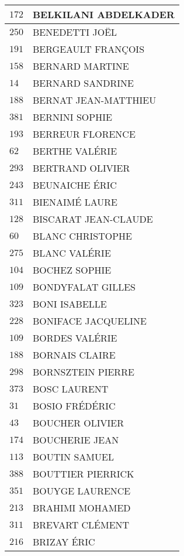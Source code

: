 \begin{xltabular}{\linewidth}{|l|X|}
    \hline
    $172$ & BELKILANI ABDELKADER \\
    \hline
    $250$ & BENEDETTI JOËL \\
    \hline
    $191$ & BERGEAULT FRANÇOIS \\
    \hline
    $158$ & BERNARD MARTINE \\
    \hline
    $14$ & BERNARD SANDRINE \\
    \hline
    $188$ & BERNAT JEAN-MATTHIEU \\
    \hline
    $381$ & BERNINI SOPHIE \\
    \hline
    $193$ & BERREUR FLORENCE \\
    \hline
    $62$ & BERTHE VALÉRIE \\
    \hline
    $293$ & BERTRAND OLIVIER \\
    \hline
    $243$ & BEUNAICHE ÉRIC \\
    \hline
    $311$ & BIENAIMÉ LAURE \\
    \hline
    $128$ & BISCARAT JEAN-CLAUDE \\
    \hline
    $60$ & BLANC CHRISTOPHE \\
    \hline
    $275$ & BLANC VALÉRIE \\
    \hline
    $104$ & BOCHEZ SOPHIE \\
    \hline
    $109$ & BONDYFALAT GILLES \\
    \hline
    $323$ & BONI ISABELLE \\
    \hline
    $228$ & BONIFACE JACQUELINE \\
    \hline
    $109$ & BORDES VALÉRIE \\
    \hline
    $188$ & BORNAIS CLAIRE \\
    \hline
    $298$ & BORNSZTEIN PIERRE \\
    \hline
    $373$ & BOSC LAURENT \\
    \hline
    $31$ & BOSIO FRÉDÉRIC \\
    \hline
    $43$ & BOUCHER OLIVIER \\
    \hline
    $174$ & BOUCHERIE JEAN \\
    \hline
    $113$ & BOUTIN SAMUEL \\
    \hline
    $388$ & BOUTTIER PIERRICK \\
    \hline
    $351$ & BOUYGE LAURENCE \\
    \hline
    $213$ & BRAHIMI MOHAMED \\
    \hline
    $311$ & BREVART CLÉMENT \\
    \hline
    $216$ & BRIZAY ÉRIC \\

\end{xltabular}
